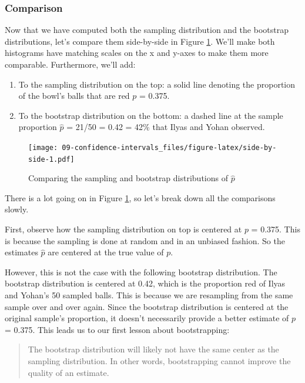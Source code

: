 \documentclass[
]{book}
\providecommand{\tightlist}{%
  \setlength{\itemsep}{0pt}\setlength{\parskip}{0pt}}
\begin{document}
\hypertarget{comparison}{%
\subsubsection*{Comparison}\label{comparison}}

Now that we have computed both the sampling distribution and the bootstrap distributions, let's compare them side-by-side in Figure \ref{fig:side-by-side}. We'll make both histograms have matching scales on the x and y-axes to make them more comparable. Furthermore, we'll add:

\begin{enumerate}
\def\labelenumi{\arabic{enumi}.}
\tightlist
\item
  To the sampling distribution on the top: a solid line denoting the proportion of the bowl's balls that are red \(p\) = 0.375.
\item
  To the bootstrap distribution on the bottom: a dashed line at the sample proportion \(\widehat{p}\) = 21/50 = 0.42 = 42\% that Ilyas and Yohan observed.
\end{enumerate}

\begin{figure}
\centering
\texttt{[image: 09-confidence-intervals\_files/figure-latex/side-by-side-1.pdf]}
\caption{\label{fig:side-by-side}Comparing the sampling and bootstrap distributions of \(\widehat{p}\)}
\end{figure}

There is a lot going on in Figure \ref{fig:side-by-side}, so let's break down all the comparisons slowly.

First, observe how the sampling distribution on top is centered at \(p\) = 0.375. This is because the sampling is done at random and in an unbiased fashion. So the estimates \(\widehat{p}\) are centered at the true value of \(p\).

However, this is not the case with the following bootstrap distribution. The bootstrap distribution is centered at 0.42, which is the proportion red of Ilyas and Yohan's 50 sampled balls. This is because we are resampling from the same sample over and over again. Since the bootstrap distribution is centered at the original sample's proportion, it doesn't necessarily provide a better estimate of \(p\) = 0.375. This leads us to our first lesson about bootstrapping:

\begin{quote}
The bootstrap distribution will likely not have the same center as the sampling distribution. In other words, bootstrapping cannot improve the quality of an estimate.
\end{quote}
\end{document}
